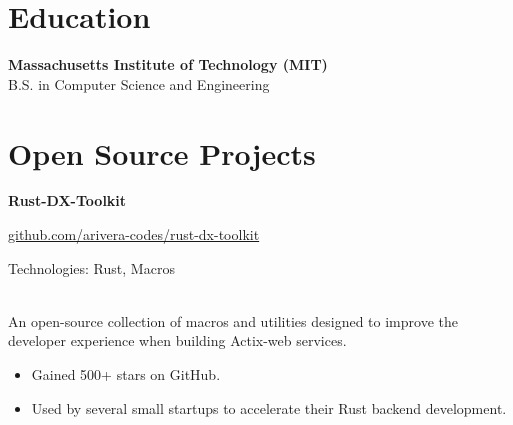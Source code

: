 \documentclass[11pt,letterpaper]{article}
\begin{document}
    \section{Education}
    \begin{infocard}[drop shadow={opacity=0}]
        \textbf{\color{headercolor} Massachusetts Institute of Technology (MIT) } \\
        \color{textcolor} B.S. in Computer Science and Engineering
    \end{infocard}





    \section{Open Source Projects}
    
        \begin{infocard}
        \textbf{\large\color{headercolor}Rust-DX-Toolkit} \hfill  \\
        \vspace{2pt}
        
            {\footnotesize\textcolor{gradientstart}{} \href{github.com/arivera-codes/rust-dx-toolkit}{github.com/arivera-codes/rust-dx-toolkit}} \\
        
        
            {\footnotesize\color{accentcolor}\raggedright Technologies: \mbox{}Rust, Macros} \\
        
        \vspace{2pt}
        \color{textcolor}
        An open-source collection of macros and utilities designed to improve the developer experience when building Actix-web services.
        
            \begin{itemize}[itemsep=2pt, parsep=1pt, leftmargin=1em]
            
                \item Gained 500+ stars on GitHub.
            
                \item Used by several small startups to accelerate their Rust backend development.
            
            \end{itemize}
        
        \end{infocard}
        \vspace{4pt}
    
\end{document}
